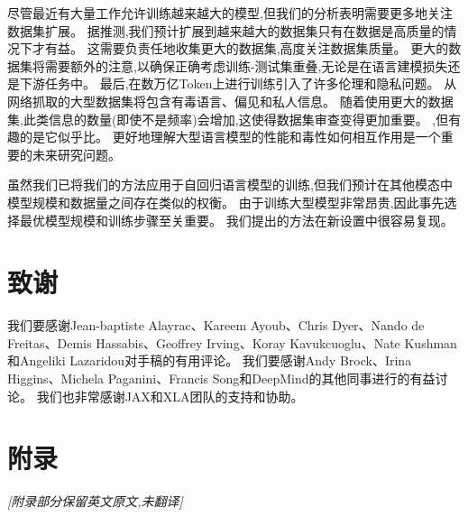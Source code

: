 \documentclass[11pt, a4paper, logo, copyright, nonumbering]{deepmind}
\newcommand{\gopher}{\textit{Gopher}\xspace}
\newcommand{\chinchilla}{\textit{Chinchilla}\xspace}
\begin{document}
尽管最近有大量工作允许训练越来越大的模型,但我们的分析表明需要更多地关注数据集扩展。
据推测,我们预计扩展到越来越大的数据集只有在数据是高质量的情况下才有益。
这需要负责任地收集更大的数据集,高度关注数据集质量。
更大的数据集将需要额外的注意,以确保正确考虑训练-测试集重叠,无论是在语言建模损失还是下游任务中。
最后,在数万亿Token上进行训练引入了许多伦理和隐私问题。
从网络抓取的大型数据集将包含有毒语言、偏见和私人信息。
随着使用更大的数据集,此类信息的数量(即使不是频率)会增加,这使得数据集审查变得更加重要。
,但有趣的是它似乎比。
更好地理解大型语言模型的性能和毒性如何相互作用是一个重要的未来研究问题。

虽然我们已将我们的方法应用于自回归语言模型的训练,但我们预计在其他模态中模型规模和数据量之间存在类似的权衡。
由于训练大型模型非常昂贵,因此事先选择最优模型规模和训练步骤至关重要。
我们提出的方法在新设置中很容易复现。

\section{致谢}
我们要感谢Jean-baptiste Alayrac、Kareem Ayoub、Chris Dyer、Nando de Freitas、Demis Hassabis、Geoffrey Irving、Koray Kavukcuoglu、Nate Kushman和Angeliki Lazaridou对手稿的有用评论。
我们要感谢Andy Brock、Irina Higgins、Michela Paganini、Francis Song和DeepMind的其他同事进行的有益讨论。
我们也非常感谢JAX和XLA团队的支持和协助。



\newpage
\appendix
\setcounter{figure}{0}
\makeatletter 
\renewcommand{\thefigure}{A\@arabic\c@figure}
\makeatother

\setcounter{table}{0}
\makeatletter 
\renewcommand{\thetable}{A\@arabic\c@table}
\makeatother

\section*{\centering \Huge{附录}}
\textit{[附录部分保留英文原文,未翻译]}
\end{document}
